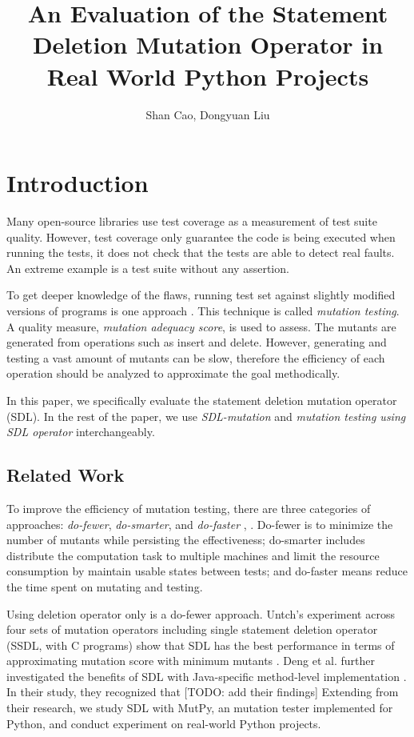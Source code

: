 \documentclass[12pt]{article}
\title{\textbf{An Evaluation of the Statement Deletion Mutation Operator in Real World Python Projects}}
\author{Shan Cao, Dongyuan Liu}
\begin{document}
\maketitle
\tableofcontents

\section{Introduction}

Many open-source libraries use test coverage as a measurement of test suite quality. However, test coverage only guarantee the code is being executed when running the tests, it does not check that the tests are able to detect real faults. An extreme example is a test suite without any assertion.

To get deeper knowledge of the flaws, running test set against slightly modified versions of programs is one approach \cite{demillo1978hints}. This technique is called \emph{mutation testing}. A quality measure, \emph{mutation adequacy score}, is used to assess. The mutants are generated from operations such as insert and delete. However, generating and testing a vast amount of mutants can be slow, therefore the efficiency of each operation should be analyzed to approximate the goal methodically.

In this paper, we specifically evaluate the statement deletion mutation operator (SDL). In the rest of the paper, we use \emph{SDL-mutation} and \emph{mutation testing using SDL operator} interchangeably.

\subsection{Related Work}

To improve the efficiency of mutation testing, there are three categories of approaches: \emph{do-fewer}, \emph{do-smarter}, and \emph{do-faster} \cite{untch1995schema}, \cite{offutt2001mutation}. Do-fewer is to minimize the number of mutants while persisting the effectiveness; do-smarter includes distribute the computation task to multiple machines and limit the resource consumption by maintain usable states between tests; and do-faster means reduce the time spent on mutating and testing.

Using deletion operator only is a do-fewer approach. Untch's experiment across four sets of mutation operators including single statement deletion operator (SSDL, with C programs) show that SDL has the best performance in terms of approximating mutation score with minimum mutants \cite{untch2009reduced}. Deng et al. further investigated the benefits of SDL with Java-specific method-level implementation \cite{deng2013empirical}. In their study, they recognized that [TODO: add their findings] Extending from their research, we study SDL with MutPy, an mutation tester implemented for Python, and conduct experiment on real-world Python projects.
\end{document}
